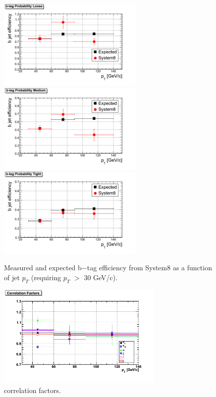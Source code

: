 \begin{figure}[htbp]
  \begin{center}
    \includegraphics[width=70mm]{Figures/JPL_Tag.png}
    \includegraphics[width=70mm]{Figures/JPM_Tag.png}
    \includegraphics[width=70mm]{Figures/JPT_Tag.png}
  \end{center}
  \caption{Measured and expected b$-$tag efficiency from System8 as a function of jet $p_T $ (requiring $p_T $ $> $ 30 GeV/c).}
  \label{fig:S8_JP_results}
\end{figure}


\begin{figure}[htbp]
  \begin{center}
    \includegraphics[width=80mm]{Figures/TCM_correlations_ppmux.png}
  \end{center}
  \caption{correlation factors.}
  \label{fig:correlation}
\end{figure}
